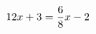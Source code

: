 \documentclass[preview]{standalone}
\begin{document}
\begin{align*}
\special{dvisvgm:raw <g id='unique000'>}12x + 3 = \frac{6}{8}x - 2\special{dvisvgm:raw </g>}
\end{align*}
\end{document}
